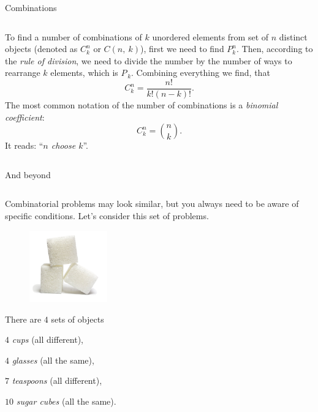\documentclass[9pt,aspectratio=169]{beamer}
\begin{document}
\begin{frame}{Combinations}
\begin{columns}[T]
\begin{column}{0.5\textwidth}
      To find a number of combinations of $k$ unordered elements from set of $n$ distinct objects (denoted as $C_k^n$ or $C(n,\ k)$), first we need to find $P_k^n$. Then, according to the \emph{rule of division}, we need to divide the number by the number of ways to rearrange $k$ elements, which is $P_{\,k}$. Combining everything we find, that
      \[
        C_k^n = \frac{n!}{k! (n-k)!}.
      \]
      The most common notation of the number of combinations is a \emph{binomial coefficient}:
      \[
        C_k^n = \binom{n}{k}.
      \]
      It reads: “\emph{$n$ choose $k$}”.

    \end{column}
  \end{columns}
\end{frame}

\begin{frame}{And beyond}
  \begin{columns}[T]
    \begin{column}{0.5\textwidth}
      Combinatorial problems may look similar, but you always need to be aware of specific conditions. Let's consider this set of problems.

      \begin{problem}%
        \begin{figure}%
          \vspace{-2em}
          \includegraphics[width=0.3\textwidth]{02 - Combinatorics 101/sugar.png}
        \end{figure}

        There are $4$ sets of objects

        \quad $4$ \emph{cups} (all different),

        \quad $4$ \emph{glasses} (all the same),

        \quad $7$ \emph{teaspoons} (all different),

        \quad $10$ \emph{sugar cubes} (all the same).


\end{problem}
\end{column}
\end{columns}
\end{frame}
\end{document}
